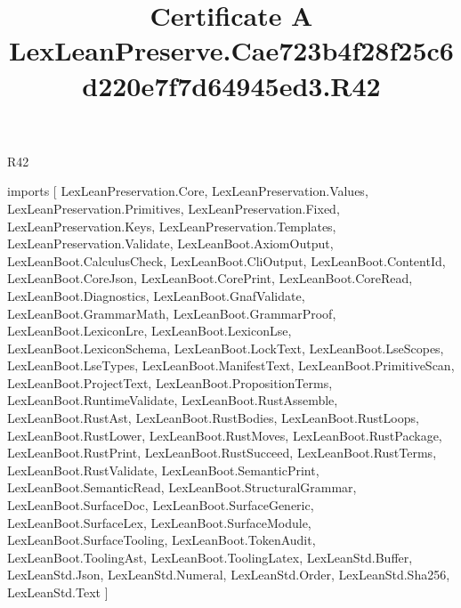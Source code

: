 \begin{lexlean}{R42}
\title{Certificate A LexLeanPreserve.Cae723b4f28f25c6d220e7f7d64945ed3.R42}
\begin{coremodule}
imports [
  LexLeanPreservation.Core,
  LexLeanPreservation.Values,
  LexLeanPreservation.Primitives,
  LexLeanPreservation.Fixed,
  LexLeanPreservation.Keys,
  LexLeanPreservation.Templates,
  LexLeanPreservation.Validate,
  LexLeanBoot.AxiomOutput,
  LexLeanBoot.CalculusCheck,
  LexLeanBoot.CliOutput,
  LexLeanBoot.ContentId,
  LexLeanBoot.CoreJson,
  LexLeanBoot.CorePrint,
  LexLeanBoot.CoreRead,
  LexLeanBoot.Diagnostics,
  LexLeanBoot.GnafValidate,
  LexLeanBoot.GrammarMath,
  LexLeanBoot.GrammarProof,
  LexLeanBoot.LexiconLre,
  LexLeanBoot.LexiconLse,
  LexLeanBoot.LexiconSchema,
  LexLeanBoot.LockText,
  LexLeanBoot.LseScopes,
  LexLeanBoot.LseTypes,
  LexLeanBoot.ManifestText,
  LexLeanBoot.PrimitiveScan,
  LexLeanBoot.ProjectText,
  LexLeanBoot.PropositionTerms,
  LexLeanBoot.RuntimeValidate,
  LexLeanBoot.RustAssemble,
  LexLeanBoot.RustAst,
  LexLeanBoot.RustBodies,
  LexLeanBoot.RustLoops,
  LexLeanBoot.RustLower,
  LexLeanBoot.RustMoves,
  LexLeanBoot.RustPackage,
  LexLeanBoot.RustPrint,
  LexLeanBoot.RustSucceed,
  LexLeanBoot.RustTerms,
  LexLeanBoot.RustValidate,
  LexLeanBoot.SemanticPrint,
  LexLeanBoot.SemanticRead,
  LexLeanBoot.StructuralGrammar,
  LexLeanBoot.SurfaceDoc,
  LexLeanBoot.SurfaceGeneric,
  LexLeanBoot.SurfaceLex,
  LexLeanBoot.SurfaceModule,
  LexLeanBoot.SurfaceTooling,
  LexLeanBoot.TokenAudit,
  LexLeanBoot.ToolingAst,
  LexLeanBoot.ToolingLatex,
  LexLeanStd.Buffer,
  LexLeanStd.Json,
  LexLeanStd.Numeral,
  LexLeanStd.Order,
  LexLeanStd.Sha256,
  LexLeanStd.Text
]


\end{coremodule}
\end{lexlean}
